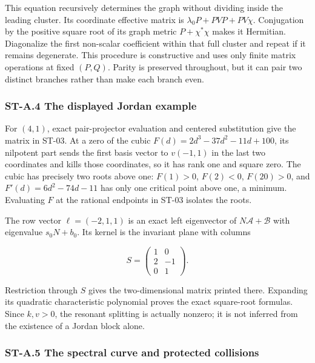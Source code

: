 This equation recursively determines the graph without dividing inside the leading cluster. Its coordinate effective matrix is \(\lambda_0P+PVP+PV\chi\). Conjugation by the positive square root of its graph metric \(P+\chi^*\chi\) makes it Hermitian. Diagonalize the first non-scalar coefficient within that full cluster and repeat if it remains degenerate. This procedure is constructive and uses only finite matrix operations at fixed \((P,Q)\). Parity is preserved throughout, but it can pair two distinct branches rather than make each branch even.

\hypertarget{st-a.4-the-displayed-jordan-example}{%
\subsubsection{ST-A.4 The displayed Jordan example}\label{st-a.4-the-displayed-jordan-example}}

For \((4,1)\), exact pair-projector evaluation and centered substitution give the matrix in ST-03. At a zero of the cubic \(F(d)=2d^3-37d^2-11d+100\), its nilpotent part sends the first basis vector to \(v(-1,1)\) in the last two coordinates and kills those coordinates, so it has rank one and square zero. The cubic has precisely two roots above one: \(F(1)>0\), \(F(2)<0\), \(F(20)>0\), and \(F'(d)=6d^2-74d-11\) has only one critical point above one, a minimum. Evaluating \(F\) at the rational endpoints in ST-03 isolates the roots.

The row vector \(\ell=(-2,1,1)\) is an exact left eigenvector of \(N\mathscr A+\mathscr B\) with eigenvalue \(s_0N+b_0\). Its kernel is the invariant plane with columns

\[
S=\begin{pmatrix}1&0\\2&-1\\0&1\end{pmatrix}.
\]

Restriction through \(S\) gives the two-dimensional matrix printed there. Expanding its quadratic characteristic polynomial proves the exact square-root formulas. Since \(k,v>0\), the resonant splitting is actually nonzero; it is not inferred from the existence of a Jordan block alone.

\hypertarget{st-a.5-the-spectral-curve-and-protected-collisions}{%
\subsubsection{ST-A.5 The spectral curve and protected collisions}\label{st-a.5-the-spectral-curve-and-protected-collisions}}

